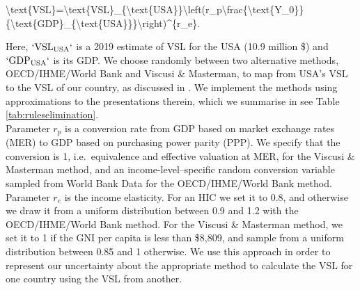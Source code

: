 \documentclass[
]{article}
\newenvironment{Shaded}{\begin{snugshade}}{\end{snugshade}}
\newcommand{\NormalTok}[1]{#1}
\begin{document}
\begin{Shaded}
\begin{Highlighting}[]
\NormalTok{\textbackslash{}text\{VSL\}=\textbackslash{}text\{VSL\}\_\{\textbackslash{}text\{USA\}\}\textbackslash{}left(r\_p\textbackslash{}frac\{\textbackslash{}text\{Y\_0\}\}\{\textbackslash{}text\{GDP\}\_\{\textbackslash{}text\{USA\}\}\}\textbackslash{}right)\^{}\{r\_e\}.}
\end{Highlighting}
\end{Shaded}

Here, \(`\text{VSL}_{\text{USA}}`\) is a 2019 estimate of VSL for the USA (10.9 million \$) and \(`\text{GDP}_{\text{USA}}`\) is its GDP. We choose randomly between two alternative methods, OECD/IHME/World Bank and Viscusi \& Masterman, to map from USA's VSL to the VSL of our country, as discussed in \citet{Robinson2021}. We implement the methods using approximations to the presentations therein, which we summarise in see Table \ref{tab:ruleselimination}.\\
Parameter \(r_p\) is a conversion rate from GDP based on market exchange rates (MER) to GDP based on purchasing power parity (PPP). We specify that the conversion is 1, i.e.~equivalence and effective valuation at MER, for the Viscusi \& Masterman method, and an income-level--specific random conversion variable sampled from World Bank Data for the OECD/IHME/World Bank method.
Parameter \(r_e\) is the income elasticity. For an HIC we set it to 0.8, and otherwise we draw it from a uniform distribution between 0.9 and 1.2 with the OECD/IHME/World Bank method. For the Viscusi \& Masterman method, we set it to 1 if the GNI per capita is less than \$8,809, and sample from a uniform distribution between 0.85 and 1 otherwise. We use this approach in order to represent our uncertainty about the appropriate method to calculate the VSL for one country using the VSL from another.
\end{document}
